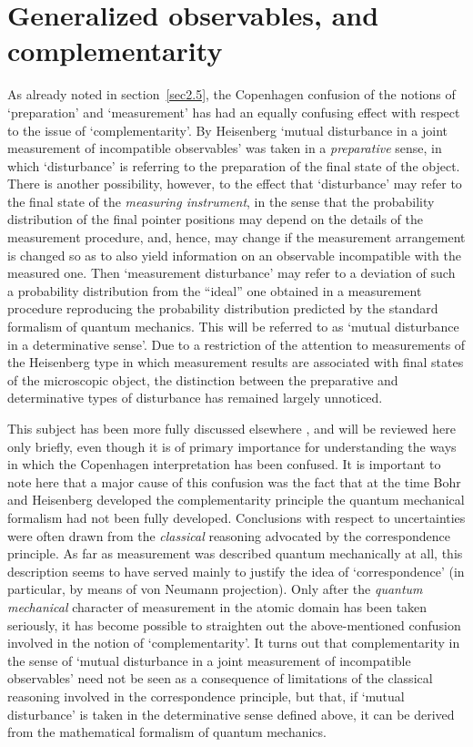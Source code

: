 \documentclass[12pt]{article}
\begin{document}
\section{Generalized observables, and complementarity} \label{sec2.8}
As already noted in section~\ref{sec2.5}, the Copenhagen confusion
of the notions of `preparation' and `measurement' has had an
equally confusing effect with respect to the issue of
`complementarity'. By Heisenberg `mutual disturbance in a joint
measurement of incompatible observables' was taken in a {\em
preparative} sense, in which  `disturbance' is referring to the
preparation of the final state of the object. There is another
possibility, however, to the effect that `disturbance' may refer
to the final state of the {\em measuring instrument}, in the sense
that the probability distribution of the final pointer positions
may depend on the details of the measurement procedure, and,
hence, may change if the measurement arrangement is changed so as
to also yield information on an observable incompatible with the
measured one. Then `measurement disturbance' may refer to a
deviation of such a probability distribution from the ``ideal''
one obtained in a measurement procedure reproducing the
probability distribution predicted by the standard formalism of
quantum mechanics. This will be referred to as `mutual disturbance
in a determinative sense'. Due to a restriction of the attention
to measurements of the Heisenberg type in which measurement
results are associated with final states of the microscopic
object, the distinction between the preparative and determinative
types of disturbance has remained largely unnoticed.

This subject has been more fully discussed elsewhere
\cite{dM2000,dM2002}, and will be reviewed here only briefly, even though
it is of primary importance for understanding the ways in which
the Copenhagen interpretation has been confused. It is important
to note here that a major cause of this confusion was the fact
that at the time Bohr and Heisenberg developed the complementarity
principle the quantum mechanical formalism had not been fully
developed. Conclusions with respect to uncertainties were often
drawn from the {\em classical} reasoning advocated by the
correspondence principle. As far as measurement was described
quantum mechanically at all, this description seems to have served
mainly to justify the idea of `correspondence' (in particular, by
means of von Neumann projection). Only after the {\em quantum
mechanical} character of measurement in the atomic domain has been
taken seriously, it has become possible to straighten out the
above-mentioned confusion involved in the notion of
`complementarity'. It turns out that complementarity in the sense
of `mutual disturbance in a joint measurement of incompatible
observables' need not be seen as a consequence of limitations of
the classical reasoning involved in the correspondence principle,
but that, if `mutual disturbance' is taken in the
determinative sense defined above, it can be derived from the mathematical formalism of quantum mechanics.
\end{document}
